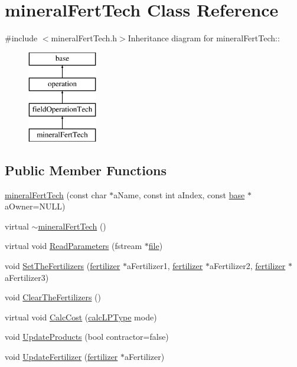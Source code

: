 \hypertarget{classmineral_fert_tech}{
\section{mineralFertTech Class Reference}
\label{classmineral_fert_tech}
}


{\ttfamily \#include $<$mineralFertTech.h$>$}Inheritance diagram for mineralFertTech::\begin{figure}[H]
\begin{center}
\leavevmode
\includegraphics[height=4cm]{classmineral_fert_tech}
\end{center}
\end{figure}
\subsection*{Public Member Functions}
\begin{DoxyCompactItemize}
\item 
\hyperlink{classmineral_fert_tech_a674bb0d21206f21d0f1be4dfb2f51c23}{mineralFertTech} (const char $\ast$aName, const int aIndex, const \hyperlink{classbase}{base} $\ast$aOwner=NULL)
\item 
virtual \hyperlink{classmineral_fert_tech_a50a838abe5a9ada44346633c11f9df65}{$\sim$mineralFertTech} ()
\item 
virtual void \hyperlink{classmineral_fert_tech_a25acfef0b5b6f2a6463fe9249d13cb9a}{ReadParameters} (fstream $\ast$\hyperlink{classbase_a3af52ee9891719d09b8b19b42450b6f6}{file})
\item 
void \hyperlink{classmineral_fert_tech_a462e4b0506bfd8ac6a13a4289e3dc19e}{SetTheFertilizers} (\hyperlink{classfertilizer}{fertilizer} $\ast$aFertilizer1, \hyperlink{classfertilizer}{fertilizer} $\ast$aFertilizer2, \hyperlink{classfertilizer}{fertilizer} $\ast$aFertilizer3)
\item 
void \hyperlink{classmineral_fert_tech_ad5c4b3218a84dfd14c05eddb9d686d52}{ClearTheFertilizers} ()
\item 
virtual void \hyperlink{classmineral_fert_tech_a0b0d6226496238a9c11637a3c70429ee}{CalcCost} (\hyperlink{typer_8h_af05cf854fc14086a0d6404be5ae9813f}{calcLPType} mode)
\item 
void \hyperlink{classmineral_fert_tech_aeaae651d9f15846abd36be1a03e782db}{UpdateProducts} (bool contractor=false)
\item 
void \hyperlink{classmineral_fert_tech_a33be3a005effa3e1420d9b4d97004445}{UpdateFertilizer} (\hyperlink{classfertilizer}{fertilizer} $\ast$aFertilizer)
\end{DoxyCompactItemize}
